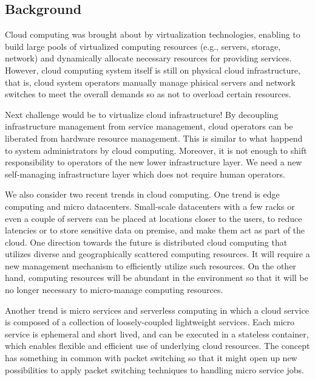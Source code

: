 \subsection{Background}

Cloud computing was brought about by virtualization technologies,
enabling to build large pools of virtualized computing resources (e.g.,
servers, storage, network) and dynamically allocate necessary resources
for providing services.
However, cloud computing system itself is still on physical cloud
infrastructure, that is, cloud system operators manually manage
phisical servers and network switches to meet the overall demands
so as not to overload certain resources.

Next challenge would be to virtualize cloud infrastructure!
By decoupling infrastructure management from service management,
cloud operators can be liberated from hardware resource management.
This is similar to what happend to system administrators by cloud
computing.
Moreover, it is not enough to shift responsibility to operators of the
new lower infrastructure layer. We need a new self-managing
infrastructure layer which does not require human operators.

We also consider two recent trends in cloud computing.
One trend is edge computing and micro datacenters.
Small-scale datacenters with a few racks or even a couple of servers
can be placed at locations closer to the users, to reduce latencies
or to store sensitive data on premise, and make them act as part of
the cloud.
One direction towards the future is distributed cloud computing that
utilizes diverse and geographically scattered computing resources.
It will require a new management mechanism to efficiently utilize such
resources.
On the other hand, computing resources will be abundant in the
environment so that it will be no longer necessary to micro-manage
computing resources.

Another trend is micro services and serverless computing in which
a cloud service is composed of a collection of loosely-coupled
lightweight services.
Each micro service is ephemeral and short lived, and can be executed
in a stateless container, 
which enables flexible and efficient use of underlying cloud
resources.
The concept has something in common with packet switching so that
it might open up new possibilities to apply packet switching
techniques to handling micro service jobs.

